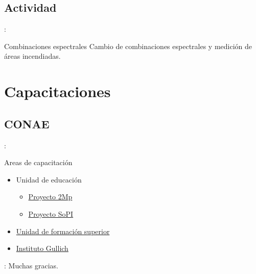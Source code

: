 \documentclass[aspectratio=169]{beamer}
\begin{document}
\subsection{Actividad}

\begin{frame}{\secname : \subsecname}
    \begin{alertblock}{Combinaciones espectrales}
        Cambio de combinaciones espectrales y medición de áreas incendiadas.
    \end{alertblock}
\end{frame}

\section{Capacitaciones}
\subsection{CONAE}
\begin{frame}{\secname : \subsecname}
    \begin{block}{Areas de capacitación}
    \begin{itemize}
        \item Unidad de educación
        \begin{itemize}
            \item \href{https://2mp.conae.gov.ar}{Proyecto 2Mp}
            \item \href{https://sopi.conae.gov.ar}{Proyecto SoPI}
        \end{itemize}
        \item \href{http://ufs.conae.gov.ar/}{Unidad de formación superior}
        \item \href{http://ig.edu.ar/}{Instituto Gullich}
    \end{itemize}
    \end{block}
\end{frame}

\begin{frame}{\secname : \subsecname}
    Muchas gracias.
\end{frame}

\begin{frame}[t,allowframebreaks]
        \printbibliography
\end{frame}
\end{document}
